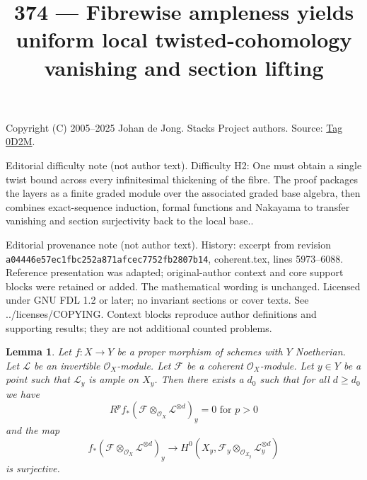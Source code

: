 \documentclass{amsart}
\theoremstyle{plain}
\newtheorem{lemma}[subsection]{Lemma}
\theoremstyle{definition}
\theoremstyle{remark}
\numberwithin{equation}{subsection}
\begin{document}
\title[Stacks Project, Tag 0D2M]{374 --- Fibrewise ampleness yields uniform local twisted-cohomology vanishing and section lifting}
\maketitle
\noindent Copyright (C) 2005--2025 Johan de Jong. Stacks Project authors. Source: \href{https://stacks.math.columbia.edu/tag/0D2M}{Tag 0D2M}.

\noindent Editorial difficulty note (not author text). Difficulty H2: One must obtain a single twist bound across every infinitesimal thickening of the fibre. The proof packages the layers as a finite graded module over the associated graded base algebra, then combines exact-sequence induction, formal functions and Nakayama to transfer vanishing and section surjectivity back to the local base..

\noindent Editorial provenance note (not author text). History: excerpt from revision \texttt{a0444\allowbreak 6e57e\allowbreak c1fbc\allowbreak 252a8\allowbreak 71afc\allowbreak ec775\allowbreak 2fb28\allowbreak 07b14}, coherent.tex, lines 5973--6088. Reference presentation was adapted; original-author context and core support blocks were retained or added. The mathematical wording is unchanged. Licensed under GNU FDL 1.2 or later; no invariant sections or cover texts. See ../licenses/COPYING. Context blocks reproduce author definitions and supporting results; they are not additional counted problems.

\begin{lemma}
\label{lemma-ample-on-fibre}
Let $f : X \to Y$ be a proper morphism of schemes with $Y$ Noetherian.
Let $\mathcal{L}$ be an invertible $\mathcal{O}_X$-module.
Let $\mathcal{F}$ be a coherent $\mathcal{O}_X$-module.
Let $y \in Y$ be a point such that $\mathcal{L}_y$ is ample on $X_y$.
Then there exists a $d_0$ such that for all $d \geq d_0$ we have
$$
R^pf_*(\mathcal{F} \otimes_{\mathcal{O}_X} \mathcal{L}^{\otimes d})_y = 0
\text{ for }p > 0
$$
and the map
$$
f_*(\mathcal{F} \otimes_{\mathcal{O}_X} \mathcal{L}^{\otimes d})_y
\longrightarrow
H^0(X_y, \mathcal{F}_y \otimes_{\mathcal{O}_{X_y}} \mathcal{L}_y^{\otimes d})
$$
is surjective.
\end{lemma}
\end{document}
